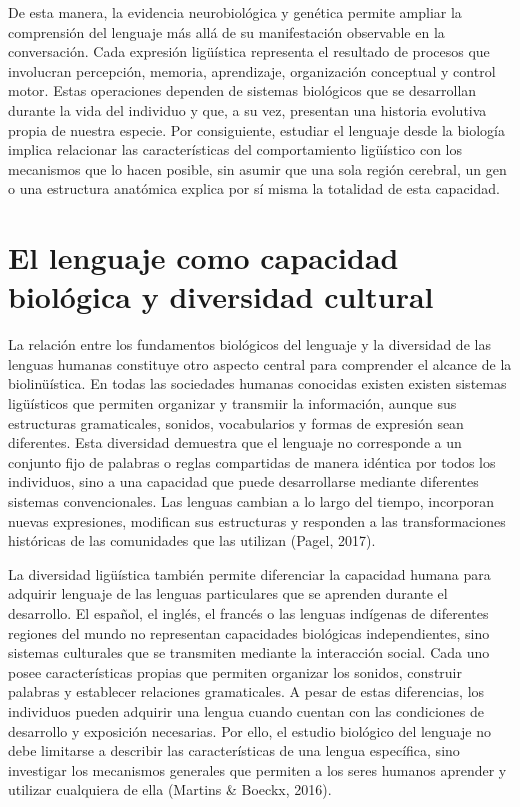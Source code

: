 \documentclass[12pt]{article}
\begin{document}
De esta manera, la evidencia neurobiológica y genética permite ampliar la comprensión del lenguaje más allá de su manifestación observable en la conversación. Cada expresión ligüística representa el resultado de procesos que involucran percepción, memoria, aprendizaje, organización conceptual y control motor. Estas operaciones dependen de sistemas biológicos que se desarrollan durante la vida del individuo y que, a su vez, presentan una historia evolutiva propia de nuestra especie. Por consiguiente, estudiar el lenguaje desde la biología implica relacionar las características del comportamiento ligüístico con los mecanismos que lo hacen posible, sin asumir que una sola región cerebral, un gen o una estructura anatómica explica por sí misma la totalidad de esta capacidad.

\section{El lenguaje como capacidad biológica y diversidad cultural}

La relación entre los fundamentos biológicos del lenguaje y la diversidad de las lenguas humanas constituye otro aspecto central para comprender el alcance de la biolinüística. En todas las sociedades humanas conocidas existen existen sistemas ligüísticos que permiten organizar y transmiir la información, aunque sus estructuras gramaticales, sonidos, vocabularios y formas de expresión sean diferentes. Esta diversidad demuestra que el lenguaje no corresponde a un conjunto fijo de palabras o reglas compartidas de manera idéntica por todos los individuos, sino a una capacidad que puede desarrollarse mediante diferentes sistemas convencionales. Las lenguas cambian a lo largo del tiempo, incorporan nuevas expresiones, modifican sus estructuras y responden a las transformaciones históricas de las comunidades que las utilizan (Pagel, 2017).

La diversidad ligüística también permite diferenciar la capacidad humana para adquirir lenguaje de las lenguas particulares que se aprenden durante el desarrollo. El español, el inglés, el francés o las lenguas indígenas de diferentes regiones del mundo no representan capacidades biológicas independientes, sino sistemas culturales que se transmiten mediante la interacción social. Cada uno posee características propias que permiten organizar los sonidos, construir palabras y establecer relaciones gramaticales. A pesar de estas diferencias, los individuos pueden adquirir una lengua cuando cuentan con las condiciones de desarrollo y exposición necesarias. Por ello, el estudio biológico del lenguaje no debe limitarse a describir las características de una lengua específica, sino investigar los mecanismos generales que permiten a los seres humanos aprender y utilizar cualquiera de ella (Martins \& Boeckx, 2016).
\end{document}
